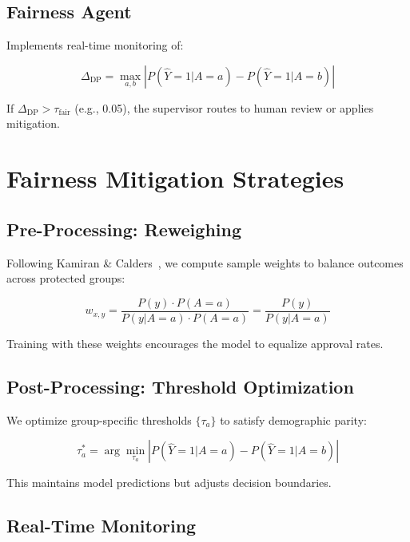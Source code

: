 \documentclass[11pt]{article}
\begin{document}
\subsection{Fairness Agent}

Implements real-time monitoring of:

\begin{equation}
\Delta_{\text{DP}} = \max_{a, b} \left| P(\hat{Y}=1|A=a) - P(\hat{Y}=1|A=b) \right|
\end{equation}

If $\Delta_{\text{DP}} > \tau_{\text{fair}}$ (e.g., 0.05), the supervisor routes to human review or applies mitigation.

\section{Fairness Mitigation Strategies}

\subsection{Pre-Processing: Reweighing}

Following Kamiran \& Calders~\cite{kamiran2012data}, we compute sample weights to balance outcomes across protected groups:

\begin{equation}
w_{x,y} = \frac{P(y) \cdot P(A=a)}{P(y|A=a) \cdot P(A=a)} = \frac{P(y)}{P(y|A=a)}
\end{equation}

Training with these weights encourages the model to equalize approval rates.

\subsection{Post-Processing: Threshold Optimization}

We optimize group-specific thresholds $\{\tau_a\}$ to satisfy demographic parity:

\begin{equation}
\tau_a^* = \arg\min_{\tau_a} \left| P(\hat{Y}=1|A=a) - P(\hat{Y}=1|A=b) \right|
\end{equation}

This maintains model predictions but adjusts decision boundaries.

\subsection{Real-Time Monitoring}
\end{document}
